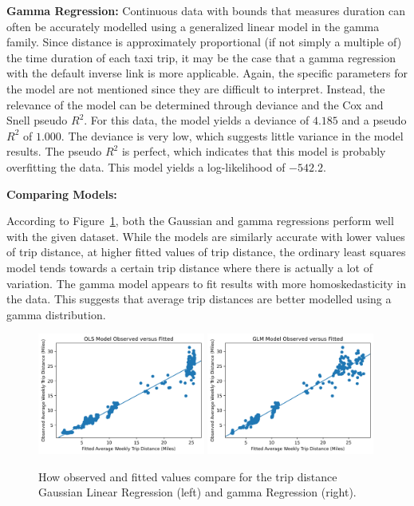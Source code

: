 \documentclass[11pt]{article}
\begin{document}
\textbf{Gamma Regression:}
Continuous data with bounds that measures duration can often be accurately modelled using a generalized linear model in the gamma family.
Since distance is approximately proportional (if not simply a multiple of) the time duration of each taxi trip,
it may be the case that a gamma regression with the default inverse link is more applicable.
Again, the specific parameters for the model are not mentioned since they are difficult to interpret.
Instead, the relevance of the model can be determined through deviance and the Cox and Snell pseudo $R^2$.
For this data, the model yields a deviance of $4.185$ and a pseudo $R^2$ of $1.000$.
The deviance is very low, which suggests little variance in the model results.
The pseudo $R^2$ is perfect, which indicates that this model is probably overfitting the data.
This model yields a log-likelihood of $-542.2$.

\textbf{Comparing Models:}

According to Figure~\ref{fig:diag}, both the Gaussian and gamma regressions perform well with the given dataset.
While the models are similarly accurate with lower values of trip distance, 
at higher fitted values of trip distance, the ordinary least squares model tends towards a certain trip distance where there is actually a lot of variation.
The gamma model appears to fit results with more homoskedasticity in the data.
This suggests that average trip distances are better modelled using a gamma distribution.

    \begin{figure}[H]
        \includegraphics[width=0.49\textwidth]{../plots/diagnostic-ols-Observed Average Weekly Trip Distance (Miles)-vs-Fitted Average Weekly Trip Distance (Miles).png}
        \includegraphics[width=0.49\textwidth]{../plots/diagnostic-glm-Observed Average Weekly Trip Distance (Miles)-vs-Fitted Average Weekly Trip Distance (Miles).png}
        \centering
        \caption{How observed and fitted values compare for the trip distance Gaussian Linear Regression (left) and gamma Regression (right).} %
        \label{fig:diag}
    \end{figure}
\end{document}
